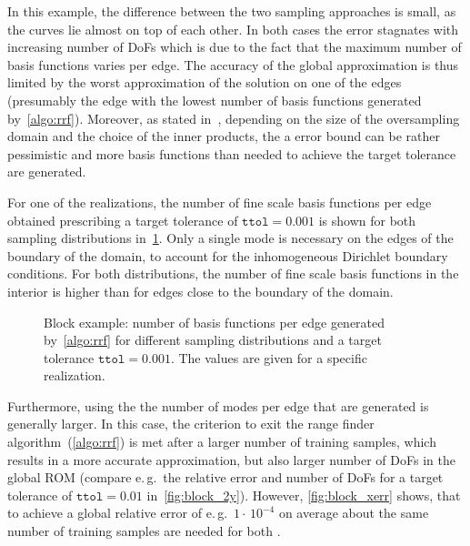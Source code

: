 \documentclass[AMA,STIX1COL,doublespace]{WileyNJD-v2}
\begin{document}
In this example, the difference between the two sampling approaches is small,
as the curves lie almost on top of each other.
In both cases the error stagnates with increasing number of
DoFs which is due to the fact that the maximum
number of basis functions varies per edge.
The accuracy of the global approximation is thus limited by the worst approximation
of the solution on one of the edges (presumably the edge with the lowest
number of basis
functions generated by~\cref{algo:rrf}).
Moreover, as stated in~\cite{BS2018}, depending on the size of the oversampling domain and
the choice of the inner products, the a 
error bound can be rather pessimistic and more basis functions than needed
to achieve the target tolerance are generated.

For one of the realizations, the number of fine scale basis functions per edge
obtained prescribing a target tolerance of $\texttt{ttol}=0.001$ is shown for both
sampling distributions
in~\cref{fig:block_num_max_modes}.
Only a single mode is necessary on the edges of the boundary of the domain,
to account for the inhomogeneous Dirichlet boundary conditions.
For both distributions, the number of fine scale basis functions in the interior
is higher than for edges close to the boundary of the domain.
\begin{figure}[htb]
	\centering
	\hfill
    \caption{Block example: number of basis functions per edge generated by~\cref{algo:rrf} for different sampling distributions and a target tolerance $\texttt{ttol}=0.001$.
    The values are given for a specific realization.}%
	\label{fig:block_num_max_modes}
\end{figure}

Furthermore, using the  the number of
modes per edge that are generated is generally larger.
In this case, the criterion to exit the range finder algorithm~(\cref{algo:rrf})
is met after a larger number of training samples, which results in a more
accurate approximation, but also larger number of DoFs in the global ROM
(compare e.\,g.\, the relative error and number of DoFs for a target
tolerance of $\texttt{ttol}=0.01$ in~\cref{fig:block_2y}).
However, \cref{fig:block_xerr} shows, that to achieve a global relative error
of e.\,g.\, $1\cdot\,10^{-4}$ on average about the same number
of training samples are needed for both .
\end{document}
